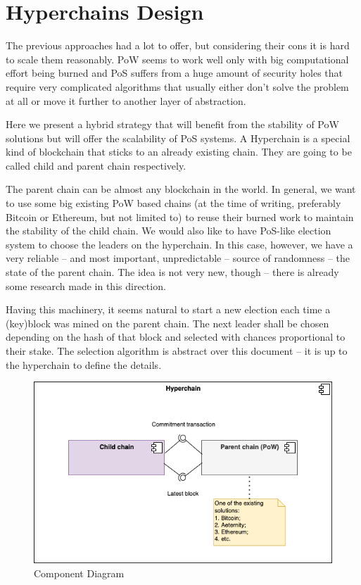 \section{Hyperchains Design}
\graphicspath{ {./images/} }

The previous approaches had a lot to offer, but considering their cons it is hard
to scale them reasonably. PoW seems to work well only with big
computational effort being burned and PoS suffers from a huge amount of security
holes that require very complicated algorithms that usually either don't solve
the problem at all or move it further to another layer of abstraction.

Here we present a hybrid strategy that will benefit from the stability of PoW
solutions but will offer the scalability of PoS systems. A Hyperchain is a
special kind of blockchain that sticks to an already existing chain. They are
going to be called child and parent chain respectively\cite{hyperchains}.

The parent chain can be almost any blockchain in the world. In general, we want
to use some big existing PoW based chains (at the time of writing, preferably
Bitcoin or Ethereum, but not limited to) to reuse their burned work to maintain
the stability of the child chain. We would also like to have
PoS-like election system to choose the leaders on the hyperchain. In this case,
however, we have a very reliable – and most important, unpredictable – source
of randomness – the state of the parent chain. The idea is not very new,
though – there is already some research made in this direction\cite{blockchain_random}.

Having this machinery, it seems natural to start a new election each time a
(key)block was mined on the parent chain. The next leader shall be chosen
depending on the hash of that block and selected with chances proportional to
their stake. The selection algorithm is abstract over this document – it is
up to the hyperchain to define the details.

\begin{figure}[h]
	\caption{Component Diagram}
	\centering
	\includegraphics[scale=0.5]{hyperchain_component}
\end{figure}

